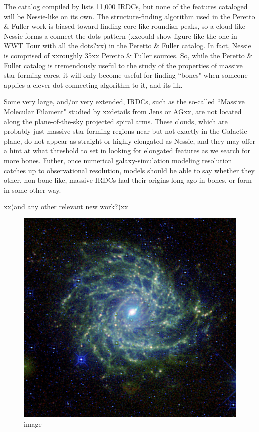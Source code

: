 \documentclass[]{article}
\makeatletter
\def\maxwidth{\ifdim\Gin@nat@width>\linewidth\linewidth
\else\Gin@nat@width\fi}
\let\Oldincludegraphics\includegraphics
\renewcommand{\includegraphics}[1]{\Oldincludegraphics[width=\maxwidth]{#1}}
\makeatother
\begin{document}
The catalog compiled by \citet{Peretto2009a} lists 11,000 IRDCs, but
none of the features cataloged will be Nessie-like on its own. The
structure-finding algorithm used in the Peretto \& Fuller work is biased
toward finding core-like roundish peaks, so a cloud like Nessie forms a
connect-the-dots pattern (xxcould show figure like the one in WWT Tour
with all the dots?xx) in the Peretto \& Fuller catalog. In fact, Nessie
is comprised of xxroughly 35xx Peretto \& Fuller sources. So, while the
Peretto \& Fuller catalog is tremendously useful to the study of the
properties of massive star forming cores, it will only become useful for
finding ``bones" when someone applies a clever dot-connecting algorithm
to it, and its ilk.

Some very large, and/or very extended, IRDCs, such as the so-called
``Massive Molecular Filament" studied by \citet{Battersby} xxdetails
from Jens or AGxx, are not located along the plane-of-the-sky projected
spiral arms. These clouds, which are probably just massive star-forming
regions near but not exactly in the Galactic plane, do not appear as
straight or highly-elongated as Nessie, and they may offer a hint at
what threshold to set in looking for elongated features as we search for
more bones. Futher, once numerical galaxy-simulation modeling resolution
catches up to observational resolution, models should be able to say
whether they other, non-bone-like, massive IRDCs had their origins long
ago in bones, or form in some other way.

xx(and any other relevant new work?)xx

\begin{figure}[htbp]
\centering
\includegraphics{figures/9ic342_jarrett_lowres/9ic342_jarrett_lowres.jpg}
\caption{image}
\end{figure}
\end{document}
